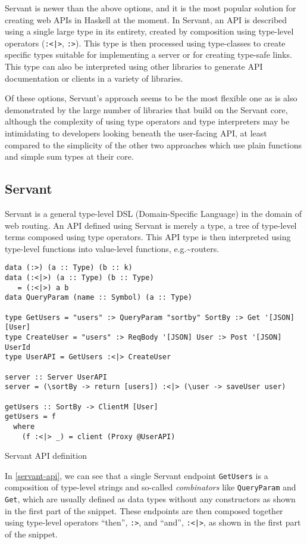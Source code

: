 \documentclass[english,odsaz]{fitthesis}
\begin{document}
Servant is newer than the above options, and it is the most popular solution for
creating web APIs in Haskell at the moment. In Servant, an API is described
using a single large type in its entirety, created by composition using
type-level operators (\texttt{:<|>}, \texttt{:>}). This type is then processed using type-classes
to create specific types suitable for implementing a server or for creating
type-safe links. This type can also be interpreted using other libraries to
generate API documentation or clients in a variety of libraries.

Of these options, Servant's approach seems to be the most flexible one as is
also demonstrated by the large number of libraries that build on the Servant
core, although the complexity of using type operators and type interpreters may
be intimidating to developers looking beneath the user-facing API, at least
compared to the simplicity of the other two approaches which use plain functions
and simple sum types at their core.

\subsection{Servant}
\label{sec:orga0bdd15}
Servant is a general type-level DSL (Domain-Specific Language) in the domain of
web routing. An API defined using Servant is merely a type, a tree of type-level
terms composed using type operators. This API type is then interpreted using
type-level functions into value-level functions, e.g.\textasciitilde{}routers.

\begin{listing}[htbp]
\begin{verbatim}
data (:>) (a :: Type) (b :: k)
data (:<|>) (a :: Type) (b :: Type)
   = (:<|>) a b
data QueryParam (name :: Symbol) (a :: Type)

type GetUsers = "users" :> QueryParam "sortby" SortBy :> Get '[JSON] [User]
type CreateUser = "users" :> ReqBody '[JSON] User :> Post '[JSON] UserId
type UserAPI = GetUsers :<|> CreateUser

server :: Server UserAPI
server = (\sortBy -> return [users]) :<|> (\user -> saveUser user)

getUsers :: SortBy -> ClientM [User]
getUsers = f
  where
    (f :<|> _) = client (Proxy @UserAPI)
\end{verbatim}
\caption{Servant API definition \label{servant-api}}
\end{listing}

In \ref{servant-api}, we can see that a single Servant endpoint \texttt{GetUsers} is a
composition of type-level strings and so-called \emph{combinators} like \texttt{QueryParam} and
\texttt{Get}, which are usually defined as data types without any constructors as shown
in the first part of the snippet. These endpoints are then composed together
using type-level operators ``then'', \texttt{:>}, and ``and'', \texttt{:<|>}, as shown in the first part
of the snippet.
\end{document}
